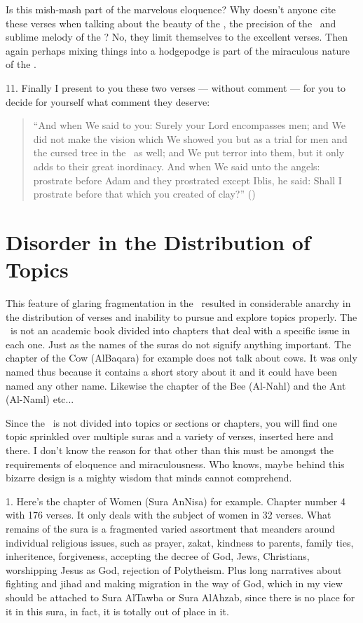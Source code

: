\documentclass[12pt]{memoir}
\renewcommand\pardivider{\centerline{\ar{۞۞۞}}}
\begin{document}
Is this mish-mash part of the marvelous eloquence?
Why doesn’t anyone cite these verses when talking
about the beauty of the \Quran,
the precision of the \Quran\ and sublime melody of the \Quran?
No, they limit themselves to the excellent verses.
Then again perhaps mixing things into a hodgepodge
is part of the miraculous nature of the \Quran.

11. Finally I present to you these two verses — without comment —
for you to decide for yourself what comment they deserve:

\begin{quote}
“And when We said to you: Surely your Lord encompasses men;
and We did not make the vision which We showed you
but as a trial for men and the cursed tree in the \Quran\ as well;
and We put terror into them, but it only adds to their great inordinacy.
And when We said unto the angels:
prostrate before Adam and they prostrated except Iblis, he said:
Shall I prostrate before that which you created of clay?”
()
\end{quote}

\pardivider


\section{Disorder in the Distribution of Topics}

This feature of glaring fragmentation in the \Quran\
resulted in considerable anarchy in the distribution of verses
and inability to pursue and explore topics properly.
The \Quran\ is not an academic book divided into chapters
that deal with a specific issue in each one.
Just as the names of the suras do not signify anything important.
The chapter of the Cow (Al\–Baqara) for example does not talk about cows.
It was only named thus because it contains a short story about it
and it could have been named any other name.
Likewise the chapter of the Bee (Al-Nahl) and the Ant (Al-Naml) etc...

Since the \Quran\ is not divided into topics or sections or chapters,
you will find one topic sprinkled over multiple suras
and a variety of verses, inserted here and there.
I don’t know the reason for that other than this must be
amongst the requirements of eloquence and miraculousness.
Who knows, maybe behind this bizarre design
is a mighty wisdom that minds cannot comprehend.

1. Here’s the chapter of Women (Sura An\–Nisa\´) for example.
Chapter number 4 with 176 verses.
It only deals with the subject of women in 32 verses.
What remains of the sura is a fragmented varied assortment
that meanders around individual religious issues,
such as prayer, zakat, kindness to parents, family ties, inheritence,
forgiveness, accepting the decree of God, Jews, Christians,
worshipping Jesus as God, rejection of Polytheism.
Plus long narratives about fighting and jihad and making migration
in the way of God, which in my view should be attached to Sura Al\–Tawba
or Sura Al\–Ahzab, since there is no place for it in this sura,
in fact, it is totally out of place in it.
\end{document}
